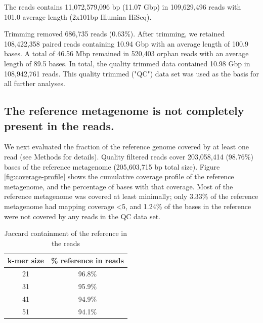 \documentclass[10pt,a4paper,twocolumn]{article}
\begin{document}
The reads contains 11,072,579,096 bp (11.07 Gbp) in 109,629,496 reads
with 101.0 average length (2x101bp Illumina HiSeq).

Trimming removed 686,735 reads (0.63\%).  After trimming, we retained
108,422,358 paired reads containing 10.94 Gbp with an average length of
100.9 bases. A total of 46.56 Mbp remained in 520,403 orphan reads with
an average length of 89.5 bases. In total, the quality trimmed data
contained 10.98 Gbp in 108,942,761 reads.  This quality trimmed ("QC")
data set was used as the basis for all further analyses.



\subsection*{The reference metagenome is not completely present in the reads.}

We next evaluated the fraction of the reference genome covered by at least
one read (see Methods for details). Quality filtered reads cover
203,058,414 (98.76\%) bases of the reference metagenome (205,603,715
bp total size).  Figure \ref{fig:coverage-profile} shows the
cumulative coverage profile of the reference metagenome, and the
percentage of bases with that coverage. Most of the reference
metagenome was covered at least minimally; only 3.33\% of the
reference metagenome had mapping coverage \textless 5, and 1.24\% of
the bases in the reference were not covered by any reads in the QC data
set.

\begin{table}[t]
\caption{Jaccard containment of the reference in the reads}
\centering
\begin{tabular}{|c|c|}
\hline
\textbf{k-mer size} & {\textbf \% reference in reads } \\ [0.5ex]
\hline
21 & 96.8\% \\
\hline
31 & 95.9\% \\
\hline
41 & 94.9\% \\
\hline
51 & 94.1\% \\
\hline
\end{tabular}
\label{table:ref_in_reads}
\end{table}
\end{document}
